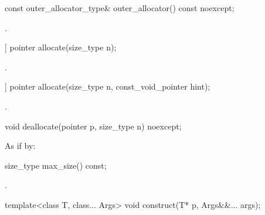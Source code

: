 %
\begin{itemdecl}
const outer_allocator_type& outer_allocator() const noexcept;
\end{itemdecl}

\begin{itemdescr}
\pnum
\returns
{}.
\end{itemdescr}

%
\begin{itemdecl}
[[nodiscard]] pointer allocate(size_type n);
\end{itemdecl}

\begin{itemdescr}
\pnum
\returns
{}.
\end{itemdescr}

%
\begin{itemdecl}
[[nodiscard]] pointer allocate(size_type n, const_void_pointer hint);
\end{itemdecl}

\begin{itemdescr}
\pnum
\returns
{}.
\end{itemdescr}

%
\begin{itemdecl}
void deallocate(pointer p, size_type n) noexcept;
\end{itemdecl}

\begin{itemdescr}
\pnum
\effects
As if by:
\end{itemdescr}

%
\begin{itemdecl}
size_type max_size() const;
\end{itemdecl}

\begin{itemdescr}
\pnum
\returns
{}.
\end{itemdescr}

%
\begin{itemdecl}
template<class T, class... Args>
  void construct(T* p, Args&&... args);
\end{itemdecl}

